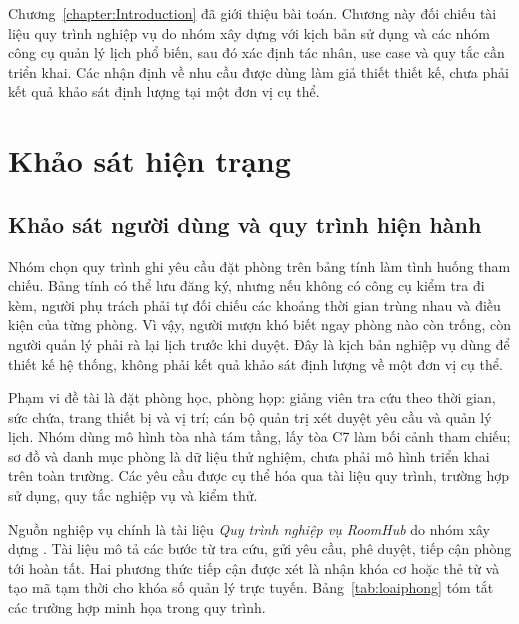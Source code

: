 \documentclass[../DoAn.tex]{subfiles}
\begin{document}
Chương~\ref{chapter:Introduction} đã giới thiệu bài toán. Chương này đối chiếu tài liệu quy trình nghiệp vụ do nhóm xây dựng với kịch bản sử dụng và các nhóm công cụ quản lý lịch phổ biến, sau đó xác định tác nhân, use case và quy tắc cần triển khai. Các nhận định về nhu cầu được dùng làm giả thiết thiết kế, chưa phải kết quả khảo sát định lượng tại một đơn vị cụ thể.

\section{Khảo sát hiện trạng}
\label{section:2.1}

\subsection{Khảo sát người dùng và quy trình hiện hành}
Nhóm chọn quy trình ghi yêu cầu đặt phòng trên bảng tính làm tình huống tham chiếu. Bảng tính có thể lưu đăng ký, nhưng nếu không có công cụ kiểm tra đi kèm, người phụ trách phải tự đối chiếu các khoảng thời gian trùng nhau và điều kiện của từng phòng. Vì vậy, người mượn khó biết ngay phòng nào còn trống, còn người quản lý phải rà lại lịch trước khi duyệt. Đây là kịch bản nghiệp vụ dùng để thiết kế hệ thống, không phải kết quả khảo sát định lượng về một đơn vị cụ thể.

Phạm vi đề tài là đặt phòng học, phòng họp: giảng viên tra cứu theo thời gian, sức chứa, trang thiết bị và vị trí; cán bộ quản trị xét duyệt yêu cầu và quản lý lịch. Nhóm dùng mô hình tòa nhà tám tầng, lấy tòa C7 làm bối cảnh tham chiếu; sơ đồ và danh mục phòng là dữ liệu thử nghiệm, chưa phải mô hình triển khai trên toàn trường. Các yêu cầu được cụ thể hóa qua tài liệu quy trình, trường hợp sử dụng, quy tắc nghiệp vụ và kiểm thử.

Nguồn nghiệp vụ chính là tài liệu \emph{Quy trình nghiệp vụ RoomHub} do nhóm xây dựng \cite{quytrinh2026}. Tài liệu mô tả các bước từ tra cứu, gửi yêu cầu, phê duyệt, tiếp cận phòng tới hoàn tất. Hai phương thức tiếp cận được xét là nhận khóa cơ hoặc thẻ từ và tạo mã tạm thời cho khóa số quản lý trực tuyến. Bảng~\ref{tab:loaiphong} tóm tắt các trường hợp minh họa trong quy trình.
\end{document}
